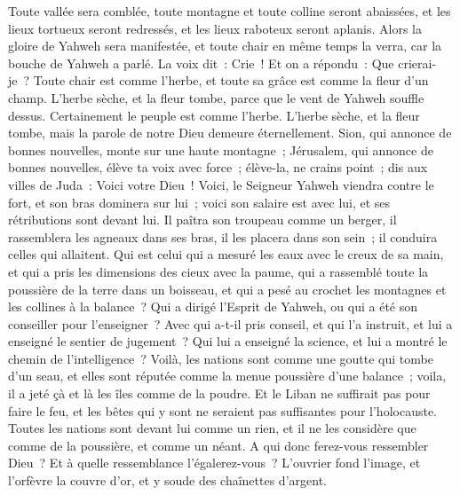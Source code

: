 \begin{multicols}{2}
Toute vallée sera comblée, toute montagne et toute colline seront abaissées, et les lieux tortueux seront redressés, et les lieux raboteux seront aplanis.
Alors la gloire de Yahweh sera manifestée, et toute chair en même temps la verra, car la bouche de Yahweh a parlé.
La voix dit~: Crie~! Et on a répondu~: Que crierai-je~? Toute chair est comme l'herbe, et toute sa grâce est comme la fleur d'un champ.
L'herbe sèche, et la fleur tombe, parce que le vent de Yahweh souffle dessus. Certainement le peuple est comme l'herbe.
L'herbe sèche, et la fleur tombe, mais la parole de notre Dieu demeure éternellement.
Sion, qui annonce de bonnes nouvelles, monte sur une haute montagne~; Jérusalem, qui annonce de bonnes nouvelles, élève ta voix avec force~; élève-la, ne crains point~; dis aux villes de Juda~: Voici votre Dieu~!
Voici, le Seigneur Yahweh viendra contre le fort, et son bras dominera sur lui~; voici son salaire est avec lui, et ses rétributions sont devant lui.
Il paîtra son troupeau comme un berger, il rassemblera les agneaux dans ses bras, il les placera dans son sein~; il conduira celles qui allaitent.
Qui est celui qui a mesuré les eaux avec le creux de sa main, et qui a pris les dimensions des cieux avec la paume, qui a rassemblé toute la poussière de la terre dans un boisseau, et qui a pesé au crochet les montagnes et les collines à la balance~?
Qui a dirigé l'Esprit de Yahweh, ou qui a été son conseiller pour l'enseigner~?
Avec qui a-t-il pris conseil, et qui l'a instruit, et lui a enseigné le sentier de jugement~? Qui lui a enseigné la science, et lui a montré le chemin de l'intelligence~?
Voilà, les nations sont comme une goutte qui tombe d'un seau, et elles sont réputée comme la menue poussière d'une balance~; voila, il a jeté çà et là les îles comme de la poudre.
Et le Liban ne suffirait pas pour faire le feu, et les bêtes qui y sont ne seraient pas suffisantes pour l'holocauste.
Toutes les nations sont devant lui comme un rien, et il ne les considère que comme de la poussière, et comme un néant.
A qui donc ferez-vous ressembler Dieu~? Et à quelle ressemblance l'égalerez-vous~?
L'ouvrier fond l'image, et l'orfèvre la couvre d'or, et y soude des chaînettes d'argent.

\end{multicols}
